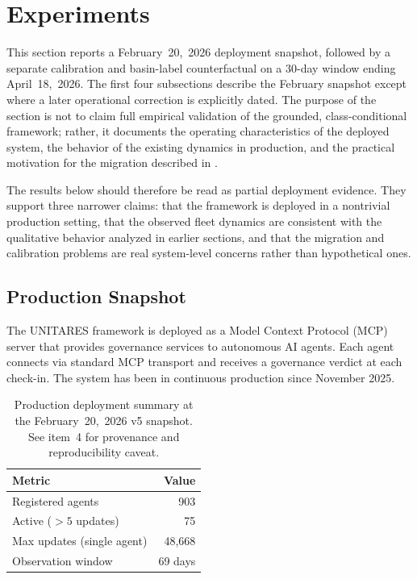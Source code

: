 \documentclass[11pt,twocolumn]{article}
\begin{document}
\section{Experiments}
\label{sec:experiments}

This section reports a February~20,~2026 deployment snapshot,
followed by a separate calibration and basin-label counterfactual
on a 30-day window ending April~18,~2026. The first four
subsections describe the February snapshot except where a later
operational correction is explicitly dated. The purpose of the section is not to claim
full empirical validation of the grounded, class-conditional framework;
rather, it documents the operating characteristics of the deployed
system, the behavior of the existing dynamics in production, and the
practical motivation for the migration described in
.

The results below should therefore be read as partial deployment
evidence. They support three narrower claims: that the framework is
deployed in a nontrivial production setting, that the observed fleet
dynamics are consistent with the qualitative behavior analyzed in
earlier sections, and that the migration and calibration problems are
real system-level concerns rather than hypothetical ones.

\subsection{Production Snapshot}

The UNITARES framework is deployed as a Model Context Protocol (MCP)
server that provides governance services to autonomous AI agents. Each
agent connects via standard MCP transport and receives a
governance verdict at each check-in. The system has been in continuous production
since November 2025.

\begin{table}[htbp]
\centering
\small
\caption{Production deployment summary at the February~20,~2026
v5 snapshot. See  item~4 for provenance
and reproducibility caveat.}
\label{tab:deployment}
\begin{tabular}{@{}lr@{}}
\toprule
\textbf{Metric} & \textbf{Value} \\
\midrule
Registered agents & 903 \\
Active ($>5$ updates) & 75 \\
Max updates (single agent) & 48{,}668 \\
Observation window & 69 days \\
\bottomrule
\end{tabular}
\end{table}
\end{document}
